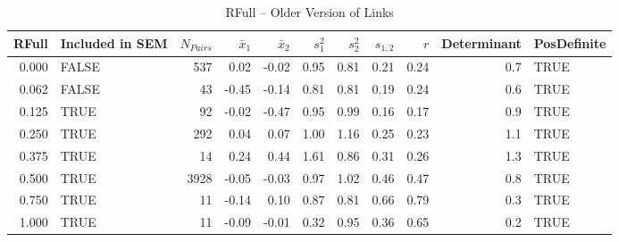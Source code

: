 \documentclass{article}\usepackage[]{graphicx}\usepackage[]{color}
\begin{document}
\begin{table}[ht]
\centering
\begin{tabular}{rlrrrrrrrrl}
  \hline
RFull & Included in SEM & $N_{Pairs}$ & $\bar{x}_1$ & $\bar{x}_2$ & $s_1^2$ & $s_2^2$ & $s_{1,2}$ & $r$ & Determinant & PosDefinite \\ 
  \hline
0.000 & FALSE & 537 & 0.02 & -0.02 & 0.95 & 0.81 & 0.21 & 0.24 & 0.7 & TRUE \\ 
  0.062 & FALSE & 43 & -0.45 & -0.14 & 0.81 & 0.81 & 0.19 & 0.24 & 0.6 & TRUE \\ 
  0.125 & TRUE & 92 & -0.02 & -0.47 & 0.95 & 0.99 & 0.16 & 0.17 & 0.9 & TRUE \\ 
  0.250 & TRUE & 292 & 0.04 & 0.07 & 1.00 & 1.16 & 0.25 & 0.23 & 1.1 & TRUE \\ 
  0.375 & TRUE & 14 & 0.24 & 0.44 & 1.61 & 0.86 & 0.31 & 0.26 & 1.3 & TRUE \\ 
  0.500 & TRUE & 3928 & -0.05 & -0.03 & 0.97 & 1.02 & 0.46 & 0.47 & 0.8 & TRUE \\ 
  0.750 & TRUE & 11 & -0.14 & 0.10 & 0.87 & 0.81 & 0.66 & 0.79 & 0.3 & TRUE \\ 
  1.000 & TRUE & 11 & -0.09 & -0.01 & 0.32 & 0.95 & 0.36 & 0.65 & 0.2 & TRUE \\ 
   \hline
\end{tabular}
\caption{RFull -- Older Version of Links} 
\end{table}
\end{document}

